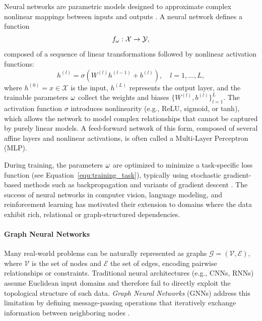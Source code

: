 Neural networks are parametric models designed to approximate complex nonlinear mappings between inputs and outputs \cite{hornik_multilayer_1989,goodfellow_deep_2016}. A neural network defines a function 
\begin{equation}
    f_{\omega} : \mathcal{X} \rightarrow \mathcal{Y},
\end{equation}
composed of a sequence of linear transformations followed by nonlinear activation functions:
\begin{equation}
    h^{(l)} = \sigma\!\left(W^{(l)} h^{(l-1)} + b^{(l)}\right), \quad l = 1, \dots, L,
\end{equation}
where $h^{(0)} = x \in \mathcal{X}$ is the input, $h^{(L)}$ represents the output layer, and the trainable parameters $\omega$ collect the weights and biases $\{W^{(l)}, b^{(l)}\}_{l=1}^{L}$. The activation function $\sigma$ introduces nonlinearity (e.g., ReLU, sigmoid, or tanh), which allows the network to model complex relationships that cannot be captured by purely linear models. A feed-forward network of this form, composed of several affine layers and nonlinear activations, is often called a Multi-Layer Perceptron (MLP).

During training, the parameters $\omega$ are optimized to minimize a task-specific loss function (see Equation~\ref{equ:training_task}), typically using stochastic gradient-based methods such as backpropagation and variants of gradient descent \cite{rumelhart_learning_1986,kingma_adam_2014}. The success of neural networks in computer vision, language modeling, and reinforcement learning has motivated their extension to domains where the data exhibit rich, relational or graph-structured dependencies.



\paragraph{Graph Neural Networks}
Many real-world problems can be naturally represented as graphs $\mathcal{G} = (\mathcal{V}, \mathcal{E})$, where $\mathcal{V}$ is the set of nodes and $\mathcal{E}$ the set of edges, encoding pairwise relationships or constraints. Traditional neural architectures (e.g., CNNs, RNNs) assume Euclidean input domains and therefore fail to directly exploit the topological structure of such data. \emph{Graph Neural Networks} (GNNs) address this limitation by defining message-passing operations that iteratively exchange information between neighboring nodes \cite{scarselli_graph_2009,kipf_semi-supervised_2017,bronstein_geometric_2017}. 

